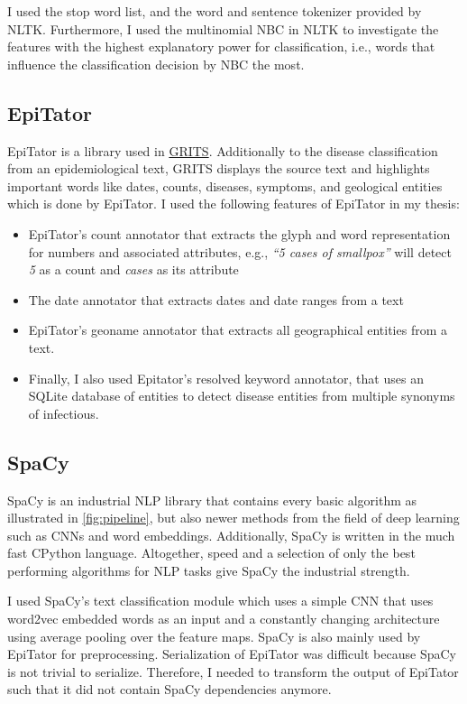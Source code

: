   I used the stop word list, and the word and sentence tokenizer provided by NLTK.
  Furthermore, I used the multinomial NBC in NLTK to investigate the features with the highest explanatory power for classification, i.e., words that influence the classification decision by NBC the most.


\subsection{EpiTator}
  EpiTator is a library used in \href{https://grits.eha.io}{GRITS}.
  Additionally to the disease classification from an epidemiological text, GRITS displays the source text and highlights important words like dates, counts, diseases, symptoms, and geological entities which is done by EpiTator.
  I used the following features of EpiTator in my thesis:
  \begin{itemize}
    \item EpiTator's count annotator that extracts the glyph and word representation for numbers and associated attributes, e.g., \textit{``5 cases of smallpox''} will detect \textit{5} as a count and \textit{cases} as its attribute
    \item The date annotator that extracts dates and date ranges from a text
    \item EpiTator's geoname annotator that extracts all geographical entities from a text.
    \item Finally, I also used Epitator's resolved keyword annotator, that uses an SQLite database of entities to detect disease entities from multiple synonyms of infectious.
  \end{itemize}


\subsection{SpaCy}
  SpaCy is an industrial NLP library that contains every basic algorithm as illustrated in \ref{fig:pipeline}, but also newer methods from the field of deep learning such as CNNs and word embeddings.
  Additionally, SpaCy is written in the much fast CPython language.
  Altogether, speed and a selection of only the best performing algorithms for NLP tasks give SpaCy the industrial strength.

  I used SpaCy's text classification module which uses a simple CNN that uses word2vec embedded words as an input and a constantly changing architecture using average pooling over the feature maps.
  SpaCy is also mainly used by EpiTator for preprocessing. Serialization of EpiTator was difficult because SpaCy is not trivial to serialize.
  Therefore, I needed to transform the output of EpiTator such that it did not contain SpaCy dependencies anymore.

